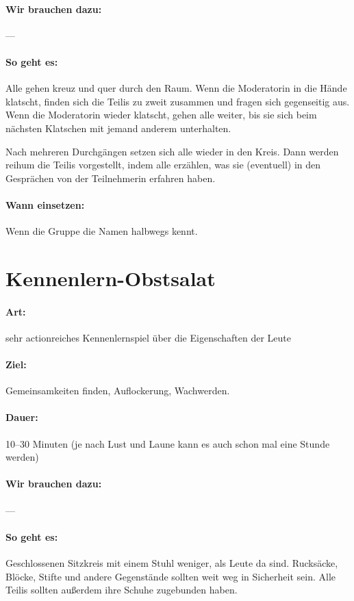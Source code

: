 \paragraph{Wir brauchen dazu:} ---
\paragraph{So geht es:}
Alle gehen kreuz und quer durch den Raum. Wenn die Moderatorin in die Hände klatscht, finden sich die Teilis zu zweit zusammen und fragen sich gegenseitig aus. Wenn die Moderatorin wieder klatscht, gehen alle weiter, bis sie sich beim nächsten Klatschen mit jemand anderem unterhalten.

Nach mehreren Durchgängen setzen sich alle wieder in den Kreis. Dann werden reihum die Teilis vorgestellt, indem alle erzählen, was sie (eventuell) in den Gesprächen von der Teilnehmerin erfahren haben.
\paragraph{Wann einsetzen:} Wenn die Gruppe die Namen halbwegs kennt.

\section{Kennenlern-Obstsalat}
\paragraph{Art:} sehr actionreiches Kennenlernspiel über die Eigenschaften der Leute
\paragraph{Ziel:} Gemeinsamkeiten finden, Auflockerung, Wachwerden.
\paragraph{Dauer:} 10--30 Minuten (je nach Lust und Laune kann es auch schon mal eine Stunde werden)
\paragraph{Wir brauchen dazu:} ---
\paragraph{So geht es:} Geschlossenen Sitzkreis mit einem Stuhl weniger, als Leute da sind. Rucksäcke, Blöcke, Stifte und andere Gegenstände sollten weit weg in Sicherheit sein. Alle Teilis sollten außerdem ihre Schuhe zugebunden haben.

